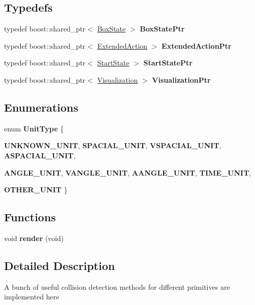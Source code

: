 \subsection*{Typedefs}
\begin{DoxyCompactItemize}
\item 
\hypertarget{namespaceCartWheel_ace0c04b38db6454844c1e87997abd95d}{
typedef boost::shared\_\-ptr$<$ \hyperlink{classCartWheel_1_1BoxState}{BoxState} $>$ {\bfseries BoxStatePtr}}
\label{namespaceCartWheel_ace0c04b38db6454844c1e87997abd95d}

\item 
\hypertarget{namespaceCartWheel_a11d5e4f3c3856930f0559d4bc4c3a831}{
typedef boost::shared\_\-ptr$<$ \hyperlink{classCartWheel_1_1ExtendedAction}{ExtendedAction} $>$ {\bfseries ExtendedActionPtr}}
\label{namespaceCartWheel_a11d5e4f3c3856930f0559d4bc4c3a831}

\item 
\hypertarget{namespaceCartWheel_af0f5145fea2ec3d3ba49613f281a987a}{
typedef boost::shared\_\-ptr$<$ \hyperlink{classCartWheel_1_1StartState}{StartState} $>$ {\bfseries StartStatePtr}}
\label{namespaceCartWheel_af0f5145fea2ec3d3ba49613f281a987a}

\item 
\hypertarget{namespaceCartWheel_aa46c79ae7cd268e14e17bf7464c86cc1}{
typedef boost::shared\_\-ptr$<$ \hyperlink{classCartWheel_1_1Visualization}{Visualization} $>$ {\bfseries VisualizationPtr}}
\label{namespaceCartWheel_aa46c79ae7cd268e14e17bf7464c86cc1}

\end{DoxyCompactItemize}
\subsection*{Enumerations}
\begin{DoxyCompactItemize}
\item 
enum {\bfseries UnitType} \{ \par
{\bfseries UNKNOWN\_\-UNIT}, 
{\bfseries SPACIAL\_\-UNIT}, 
{\bfseries VSPACIAL\_\-UNIT}, 
{\bfseries ASPACIAL\_\-UNIT}, 
\par
{\bfseries ANGLE\_\-UNIT}, 
{\bfseries VANGLE\_\-UNIT}, 
{\bfseries AANGLE\_\-UNIT}, 
{\bfseries TIME\_\-UNIT}, 
\par
{\bfseries OTHER\_\-UNIT}
 \}
\end{DoxyCompactItemize}
\subsection*{Functions}
\begin{DoxyCompactItemize}
\item 
\hypertarget{namespaceCartWheel_ab5f73234719cfd0fb887b3f6108148b5}{
void {\bfseries render} (void)}
\label{namespaceCartWheel_ab5f73234719cfd0fb887b3f6108148b5}

\end{DoxyCompactItemize}


\subsection{Detailed Description}
A bunch of useful collision detection methods for different primitives are implemented here 